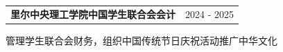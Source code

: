 \documentclass[UTF8]{article}
\begin{document}
{\begin{minipage}[t][\dimexpr\textheight-2\fboxrule-2\fboxsep\relax][t]{\dimexpr0.6\textwidth-2\fboxrule-2\fboxsep\relax}
\begin{tabularx}{\linewidth}{X r}
    \large \textbf{里尔中央理工学院中国学生联合会会计} &  2024 - 2025 \\
\end{tabularx}
{管理学生联合会财务，组织中国传统节日庆祝活动推广中华文化} \\[0.6em]

        \vfill%
        \vfill%
    \end{minipage}
}%
\end{document}
